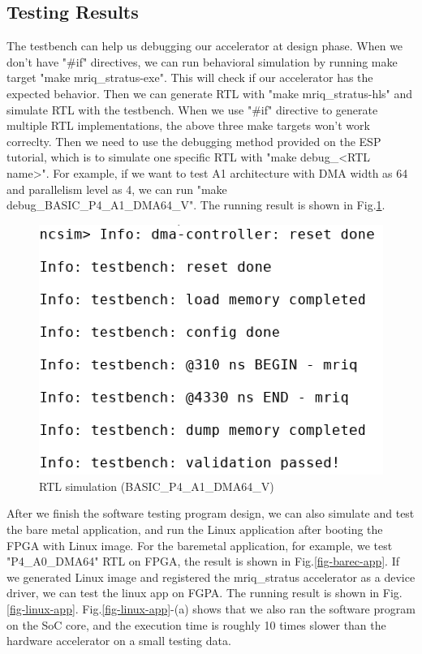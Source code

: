 \subsection{Testing Results}

The testbench can help us debugging our accelerator at design phase. When we
don't have "\#if" directives, we can run behavioral simulation by running make
target "make mriq\_stratus-exe". This will check if our accelerator has the
expected behavior. Then we can generate RTL with "make mriq\_stratus-hls" and
simulate RTL with the testbench. When we use "\#if" directive to generate
multiple RTL implementations, the above three make targets won't work
correclty. Then we need to use the debugging method provided on the ESP
tutorial, which is to simulate one specific RTL with "make debug\_<RTL
name>". For example, if we want to test A1 architecture with DMA width as 64 and
parallelism level as 4, we can run "make debug\_BASIC\_P4\_A1\_DMA64\_V". The
running result is shown in Fig.\ref{fig-3}.  \\

\begin{figure}[ht]
\centering
\captionsetup{justification=centering, format=hang}
\includegraphics[width=0.75\columnwidth]{figures/reverted-debug-sim-A1-4-4-2-2.png}
\caption{RTL simulation (BASIC\_P4\_A1\_DMA64\_V)}
\label{fig-3}
\end{figure}

After we finish the software testing program design, we can also simulate and
test the bare metal application, and run the Linux application after booting the
FPGA with Linux image. For the baremetal application, for example, we test
"P4\_A0\_DMA64" RTL on FPGA, the result is shown in Fig.\ref{fig-barec-app}. If
we generated Linux image and registered the mriq\_stratus accelerator as a
device driver, we can test the linux app on FGPA. The running result is shown in
Fig.\ref{fig-linux-app}. Fig.\ref{fig-linux-app}-(a) shows that we also ran the
software program on the SoC core, and the execution time is roughly 10 times
slower than the hardware accelerator on a small testing data.


